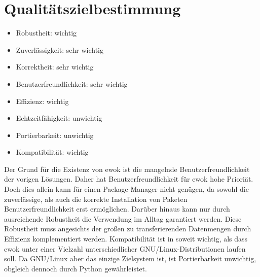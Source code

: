 \chapter{Qualitätszielbestimmung}

\begin{itemize}
	\item Robustheit: wichtig
	\item Zuverlässigkeit: sehr wichtig
	\item Korrektheit: sehr wichtig
	\item Benutzerfreundlichkeit: sehr wichtig
	\item Effizienz: wichtig
	\item Echtzeitfähigkeit: unwichtig
	\item Portierbarkeit: unwichtig
	\item Kompatibilität: wichtig
\end{itemize}

Der Grund für die Existenz von ewok ist die mangelnde Benutzerfreundlichkeit der vorigen Lösungen.
Daher hat Benutzerfreundlichkeit für ewok hohe Prioriät.
Doch dies allein kann für einen Package-Manager nicht genügen, da sowohl die zuverlässige, als auch die korrekte Installation von Paketen Benutzerfreundlichkeit erst ermöglichen. Darüber hinaus kann nur durch ausreichende Robustheit die Verwendung im Alltag garantiert werden. Diese Robustheit muss angesichts der großen zu transferierenden Datenmengen durch Effizienz komplementiert werden.
Kompatibilität ist in soweit wichtig, als dass ewok unter einer Vielzahl unterschiedlicher GNU/Linux-Distributionen laufen soll. Da GNU/Linux aber das einzige Zielsystem ist, ist Portierbarkeit unwichtig, obgleich dennoch durch Python gewährleistet.
